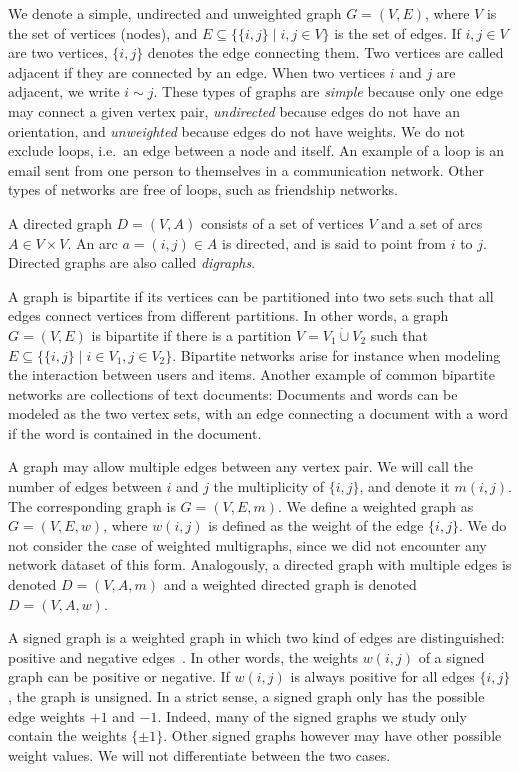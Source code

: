 \documentclass[11pt,a4paper]{book}
\newcommand{\dunion}{\mathbin{\dot\cup}} %
\begin{document}
We denote a simple, undirected and unweighted graph $G=(V,E)$, where
$V$ is the set of vertices 
(nodes), and $E \subseteq \{\{i,j\} \mid i, j \in V \}$ is the set of
edges.   
If $i,j \in V$ are two vertices, $\{i,j\}$ denotes the edge connecting them.
Two vertices are called adjacent if they are connected by an edge.  
When two vertices $i$ and $j$ are adjacent, we write $i \sim j$.  
These types of graphs are \emph{simple} because only one edge may
connect a given vertex pair, \emph{undirected} because edges do not have
an orientation, and \emph{unweighted} because edges do not have
weights. 
We do not exclude loops, i.e.\ an edge between a node and itself. An
example of a loop is an email sent from one person to themselves in a
communication network.  Other types of networks are free of loops, such
as friendship networks. 

A directed graph $D=(V,A)$ consists of a set of vertices $V$ and a set
of arcs $A \in V \times V$.  An arc $a = (i,j) \in A$ is directed, and
is said to point from $i$ to $j$.  Directed graphs are also called
\emph{digraphs}. 

A graph is bipartite if its vertices can be partitioned into two sets
such that all edges connect vertices from different partitions.  In
other words, a graph $G = (V,E)$ is bipartite if there is a partition $V
= V_1 \dunion V_2$ such that $E \subseteq \{\{i,j\} \mid i\in V_1, j \in
V_2\}$. 
Bipartite networks arise for instance when modeling the interaction between users
and items.
Another example of common bipartite networks are collections of text
documents:  Documents and words can be modeled as the two vertex sets,
with an edge connecting a document with a word if the word is contained
in the document. 

A graph may allow multiple edges between any vertex pair. 
We will call the number of edges between $i$ and $j$
the multiplicity of $\{i,j\}$, and denote it $m(i, j)$. 
The corresponding graph is $G = (V,E,m)$. 
We define a weighted graph as  $G=(V,E,w)$,
where $w(i,j)$ is defined as the weight of the edge $\{i,j\}$. 
We do not consider the case of weighted multigraphs, since we did not
encounter any network dataset of this form. 
Analogously, 
a directed graph with multiple edges is denoted $D=(V,A,m)$ and a
weighted directed graph is denoted $D=(V,A,w)$. 

A signed graph is a weighted graph in which two kind of edges are
distinguished: positive and negative edges~\cite{b647}.  In other words,
the weights 
$w(i,j)$ of a signed graph can be positive or negative.  If $w(i,j)$ is
always positive for all edges $\{i,j\}$, the graph is unsigned. 
In a strict sense, a signed graph only has the possible edge weights
$+1$ and $-1$.  
Indeed, many of the signed graphs we study only contain the weights
$\{\pm 1\}$.  Other signed graphs however may have other possible weight values.
We will not differentiate between the two cases. 
\end{document}
